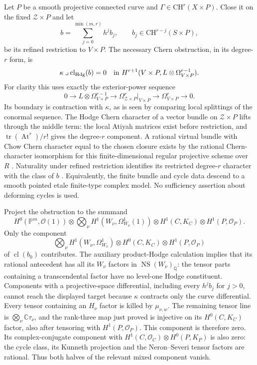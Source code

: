 Let $P$ be a smooth projective connected curve and
$\Gamma\in\mathrm{CH}^r(X\times P)$. Close it on the
fixed $\mathcal Z\times P$ and let
\[
 b=\sum_{j=0}^{\min(m,r)}h^j b_j,
 \qquad b_j\in\mathrm{CH}^{r-j}(S\times P),
\]
be its refined restriction to $V\times P$.
The necessary Chern obstruction, in its degree-$r$ form, is
\[
 \kappa\mathbin{\lrcorner}\operatorname{cl}_{\mathrm{Hdg}}(b)=0
       \quad\hbox{in }H^{r+1}
       (V\times P,L\otimes\Omega^{r-1}_{V\times P}).
\]
For clarity this uses exactly the exterior-power sequence
\[
 0\longrightarrow L\otimes\Omega^{r-1}_{V\times P}
 \longrightarrow\Omega^r_{\mathcal Z\times P}|_{V\times P}
 \longrightarrow\Omega^r_{V\times P}\longrightarrow0.
\]
Its boundary is contraction with $\kappa$, as is seen by
comparing local splittings of the conormal sequence.
The Hodge Chern character of a vector bundle on
$\mathcal Z\times P$ lifts through the middle term:
the local Atiyah matrices exist before restriction, and
$\operatorname{tr}(\operatorname{At}^r)/r!$ gives the
degree-$r$ component. A rational virtual bundle with
Chow Chern character equal to the chosen closure exists
by the rational Chern-character isomorphism for this
finite-dimensional regular projective scheme over $R$
\citep[Lemma 42.58.1, Tag 0FEY]{cyStacksChernObstruction}.
Naturality under refined restriction identifies its
restricted degree-$r$ character with the class of $b$
\citep[Remark 42.59.9, Tag 0FF8]{cyStacksChernObstruction}.
Equivalently, the finite bundle and cycle data descend
to a smooth pointed etale finite-type complex model.
No sufficiency assertion about deforming cycles is used.

Project the obstruction to the summand
\[
 H^0(\mathbb P^m,\mathcal O(1))\otimes
 \bigotimes_\nu H^1(W_\nu,\Omega^1_{W_\nu}(1))\otimes
 H^1(C,K_C)\otimes H^1(P,\mathcal O_P).
\]
Only the component
\[
 \bigotimes_\nu H^1(W_\nu,\Omega^1_{W_\nu})\otimes
 H^0(C,K_C)\otimes H^1(P,\mathcal O_P)
\]
of $\operatorname{cl}(b_0)$ contributes. The auxiliary
product-Hodge calculation implies that its rational
antecedent has all its $W_\nu$ factors in
$\operatorname{NS}(W_\nu)_{\mathbb Q}$: the tensor
parts containing a transcendental factor have no
level-one Hodge constituent. Components with a
projective-space differential, including every $h^j b_j$
for $j>0$, cannot reach the displayed target because
$\kappa$ contracts only the curve differential.
Every tensor containing an $H_\nu$ factor is killed
by $\mu_{\nu,w}$. The remaining tensor line is
$\bigotimes_\nu\mathbb C\tau_\nu$, and the rank-three
map just proved is injective on its $H^0(C,K_C)$
factor, also after tensoring with $H^1(P,\mathcal O_P)$.
This component is therefore zero.
Its complex-conjugate component with
$H^1(C,\mathcal O_C)\otimes H^0(P,K_P)$ is also zero:
the cycle class, its Kunneth projection and the
Neron--Severi tensor factors are rational. Thus both
halves of the relevant mixed component vanish.

